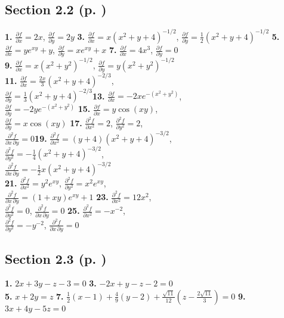 \begin{multicols}{2}
\subsection*{Section 2.2 (p. \pageref{sec2dot2})}
\textbf{1.} $\frac{\partial f}{\partial x} = 2x$, $\frac{\partial f}{\partial y} = 2y$\quad
\textbf{3.} $\frac{\partial f}{\partial x} = x(x^2 + y + 4)^{-1/2}$,
$\frac{\partial f}{\partial y} = \frac{1}{2}(x^2 + y + 4)^{-1/2}$\quad
\textbf{5.} $\frac{\partial f}{\partial x} = ye^{xy} + y$, $\frac{\partial f}{\partial y} = xe^{xy} + x$\quad
\textbf{7.} $\frac{\partial f}{\partial x} = 4x^3$, $\frac{\partial f}{\partial y} = 0$\\\textbf{9.}
$\frac{\partial f}{\partial x}=x(x^2 + y^2 )^{-1/2}$, $\frac{\partial f}{\partial y}=y(x^2 + y^2 )^{-1/2}$\\\textbf{11.}
$\frac{\partial f}{\partial x} = \frac{2x}{3}(x^2 + y + 4)^{-2/3}$,\\
$\frac{\partial f}{\partial y} = \frac{1}{3}(x^2 + y + 4)^{-2/3}$\quad\textbf{13.}
$\frac{\partial f}{\partial x}=-2xe^{-(x^2 + y^2 )}$,\\$\frac{\partial f}{\partial y}=-2ye^{-(x^2 + y^2 )}$\quad
\textbf{15.} $\frac{\partial f}{\partial x} = y\cos(xy)$,\\$\frac{\partial f}{\partial y} = x\cos(xy)$\quad
\textbf{17.}
$\frac{\partial^2 f}{\partial x^2} =2$,
$\frac{\partial^2 f}{\partial y^2} = 2$,\\
$\frac{\partial^2 f}{\partial x \,\partial y} = 0$\quad\textbf{19.}
$\frac{\partial^2 f}{\partial x^2} = (y+4)(x^2 + y+4)^{-3/2}$,\\
$\frac{\partial^2 f}{\partial y^2} = -\frac{1}{4}(x^2 + y+4)^{-3/2}$,\\
$\frac{\partial^2 f}{\partial x \,\partial y} = -\frac{1}{2}x(x^2 + y+4)^{-3/2}$\\\textbf{21.}
$\frac{\partial^2 f}{\partial x^2} = y^2 e^{xy}$,
$\frac{\partial^2 f}{\partial y^2} = x^2 e^{xy}$,\\
$\frac{\partial^2 f}{\partial x \,\partial y} = (1+xy)e^{xy} + 1$\quad
\textbf{23.} $\frac{\partial^2 f}{\partial x^2} =12x^2$,\\
$\frac{\partial^2 f}{\partial y^2} = 0$,
$\frac{\partial^2 f}{\partial x \,\partial y} = 0$\quad
\textbf{25.} $\frac{\partial^2 f}{\partial x^2} =-x^{-2}$,\\
$\frac{\partial^2 f}{\partial y^2} = -y^{-2}$,
$\frac{\partial^2 f}{\partial x \,\partial y} = 0$
\subsection*{Section 2.3 (p. \pageref{sec2dot3})}
\textbf{1.} $2x+3y-z-3=0$\quad
\textbf{3.} $-2x+y-z-2=0$\\\textbf{5.} $x+2y=z$\quad
\textbf{7.} $\frac{1}{2}(x-1)+\frac{4}{9}(y-2)+\frac{\sqrt{11}}{12}(z-\frac{2\sqrt{11}}{3})=0$\quad
\textbf{9.} $3x+4y-5z=0$

\end{multicols}
